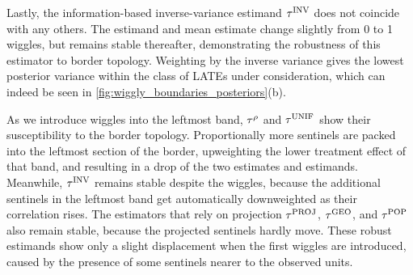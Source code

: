 \documentclass[letter,12pt]{article}
\begin{document}
Lastly, the information-based inverse-variance estimand \(\tau^{\mathrm{INV}}\) does not coincide with any others.
The estimand and mean estimate change slightly from 0 to 1 wiggles, but remains stable thereafter, demonstrating the robustness of this estimator to border topology.
Weighting by the inverse variance gives the lowest posterior variance within the class of LATEs under consideration, which can indeed be seen in \autoref{fig:wiggly_boundaries_posteriors}(b).

As we introduce wiggles into the leftmost band,
\(\tau^{\rho}\) and \(\tau^{\mathrm{UNIF}}\) show their susceptibility to the border topology.
Proportionally more sentinels are packed into the leftmost section of the border,
upweighting the lower treatment effect of that band,
and resulting in a drop of the two estimates and estimands.
Meanwhile, \(\tau^{\mathrm{INV}}\) remains stable despite the wiggles,
because the additional sentinels in the leftmost
band get automatically downweighted as their correlation rises.
The estimators that rely on projection
\(\tau^{\mathrm{PROJ}}\), \(\tau^{\mathrm{GEO}}\), and \(\tau^{\mathrm{POP}}\) also remain stable,
because the projected sentinels hardly move.
These robust estimands show only a slight displacement when the first wiggles are introduced,
caused by the presence of some sentinels nearer to the observed units.
    
\end{document}
